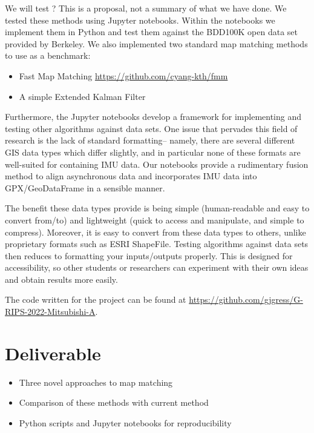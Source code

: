 \documentclass{article}
\numberwithin{equation}{section}
\theoremstyle{definition}
\begin{document}
%
{\color{blue} We will test ? This is a proposal, not a summary of what we have done.}
We tested these methods using Jupyter notebooks. Within the notebooks we implement them in Python and test them against the BDD100K open data set provided by Berkeley\cite{berkeley}. %
We also implemented two standard map matching methods to use as a benchmark: 
\begin{itemize}
    \item Fast Map Matching \url{https://github.com/cyang-kth/fmm}
    \item A simple Extended Kalman Filter %
\end{itemize}

Furthermore, the Jupyter notebooks develop a framework for implementing and testing other algorithms against data sets. One issue that pervades this field of research is the lack of standard formatting-- namely, there are several different GIS data types which differ slightly, and in particular none of these formats are well-suited for containing IMU data. Our notebooks provide a rudimentary fusion method to align asynchronous data and incorporates IMU data into GPX/GeoDataFrame in a sensible manner. 

The benefit these data types provide is being simple (human-readable and easy to convert from/to) and lightweight (quick to access and manipulate, and simple to compress). Moreover, it is easy to convert from these data types to others, unlike proprietary formats such as ESRI ShapeFile. Testing algorithms against data sets then reduces to formatting your inputs/outputs properly. This is designed for accessibility, so other students or researchers can experiment with their own ideas and obtain results more easily. %

The code written for the project can be found at \url{https://github.com/gjgress/G-RIPS-2022-Mitsubishi-A}.

\section{Deliverable}
\begin{itemize}
    \item Three novel approaches to map matching 
    \item Comparison of these methods with current method
    \item Python scripts and Jupyter notebooks for reproducibility
\end{itemize}
 
\end{document}
